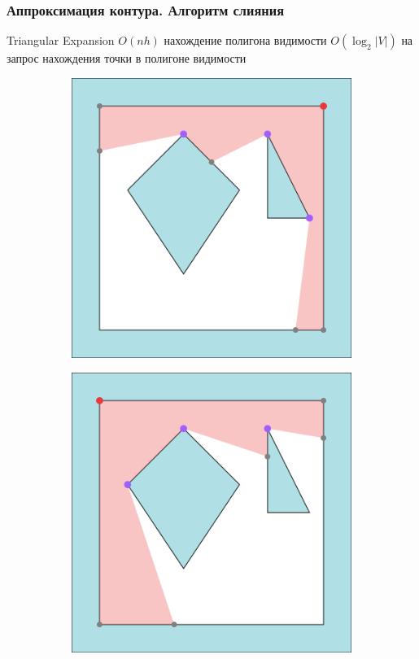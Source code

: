\documentclass[10pt, unicode]{beamer}
\begin{document}
    \begin{frame}
        \frametitle{Аппроксимация контура. Алгоритм слияния}
        Triangular Expansion $O\left(nh\right)$ нахождение полигона видимости
        $O\left(\log_2\left|V\right|\right)$ на запрос нахождения точки в полигоне видимости
        \begin{figure}[H]
            \centering
            \begin{subfigure}[t]{0.49\linewidth}
                \centering
                \includegraphics[scale=0.4]{visibility_polygon_prev_vertex.png}
            \end{subfigure}
            \begin{subfigure}[t]{0.49\linewidth}
                \centering
                \includegraphics[scale=0.4]{visibility_polygon_current_vertex.png}
            \end{subfigure}
        \end{figure}
    \end{frame}
\end{document}
